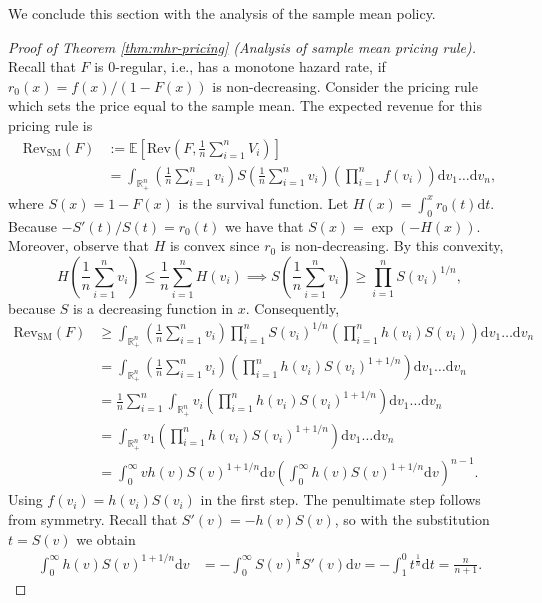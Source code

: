 \documentclass[11pt]{article}
\newcommand{\E}{\mathbb{E}}
\newcommand{\Rplus}{\mathbb{R}_+}
\newcommand{\dd}{\mathrm{d}}
\begin{document}
We conclude this section with the analysis of the sample mean policy.



\begin{proof}[Proof of Theorem \ref{thm:mhr-pricing} (Analysis of sample mean pricing rule)]

Recall that $F$ is $0$-regular, i.e., has a monotone hazard rate, if $r_0(x)=f(x)/(1-F(x))$ is non-decreasing.
    Consider the pricing rule which sets the price equal to the sample mean. The expected revenue for this pricing rule is
    \begin{align*}
        \mathrm{Rev}_{\text{SM}}(F)&:=\E\left[\mathrm{Rev}\left(F,\frac{1}{n}\sum_{i=1}^n V_i\right)\right]\\
        &=\int_{\Rplus^n}\left(\frac{1}{n}\sum_{i=1}^nv_i\right)S\left(\frac{1}{n}\sum_{i=1}^nv_i\right)\left(\prod_{i=1}^nf(v_i)\right)\dd v_1\dots\dd v_n,
    \end{align*}
    where $S(x)=1-F(x)$ is the survival function. Let $H(x)=\int_0^xr_0(t)\dd t$. Because $-S'(t)/S(t)=r_0(t)$ we have that $S(x)=\exp(-H(x))$. Moreover, observe that $H$ is convex since $r_0$ is non-decreasing. By this convexity,
    $$
        H\left(\frac{1}{n}\sum_{i=1}^nv_i\right)\le \frac{1}{n}\sum_{i=1}^nH\left(v_i\right)\implies S\left(\frac{1}{n}\sum_{i=1}^nv_i\right)\ge \prod_{i=1}^nS(v_i)^{1/n},
    $$
    because $S$ is a decreasing function in $x$.
    Consequently,
    \begin{align*}
        \mathrm{Rev}_{\text{SM}}(F)&\ge \int_{\Rplus^n}\left(\frac{1}{n}\sum_{i=1}^nv_i\right)\prod_{i=1}^nS(v_i)^{1/n}\left(\prod_{i=1}^nh(v_i)S(v_i)\right)\dd v_1\dots\dd v_n\\
    &=\int_{\Rplus^n}\left(\frac{1}{n}\sum_{i=1}^nv_i\right)\left(\prod_{i=1}^nh(v_i)S(v_i)^{1+1/n}\right)\dd v_1\dots\dd v_n\\
    &=\frac{1}{n}\sum_{i=1}^n\int_{\Rplus^n}v_i\left(\prod_{i=1}^nh(v_i)S(v_i)^{1+1/n}\right)\dd v_1\dots\dd v_n\\
    &=\int_{\Rplus^n} v_1\left(\prod_{i=1}^nh(v_i)S(v_i)^{1+1/n}\right)\dd v_1\dots\dd v_n\\
    &=\int_0^\infty v h(v)S(v)^{1+1/n}\dd v\left(\int_0^\infty h(v)S(v)^{1+1/n}\dd v\right)^{n-1}.
    \end{align*}
    Using $f(v_i)=h(v_i)S(v_i)$ in the first step. The penultimate step follows from symmetry. Recall that $S'(v)=-h(v)S(v)$, so with the substitution $t=S(v)$ we obtain
    \begin{align*}
        \int_0^\infty h(v)S(v)^{1+1/n}\dd v&=-\int_0^\infty S(v)^{\frac{1}{n}}S'(v)\dd v=-\int_1^0t^{\frac{1}{n}}\dd t=\frac{n}{n+1}.

\end{align*}
\end{proof}
\end{document}
